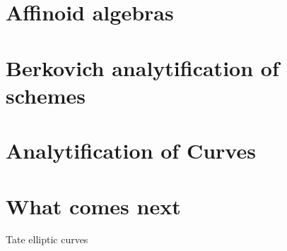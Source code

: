 \documentclass[a4paper]{article}
\begin{document}
\section{Affinoid algebras} \label{sec:affinoid_algebras}




\section{Berkovich analytification of schemes} \label{sec:berkovich_analytification_of_schemes}



\section{Analytification of Curves} \label{sec:analytification_of_curves}


\section{What comes next} \label{sec:what_comes_next}

Tate elliptic curves

\printbibliography
\end{document}
